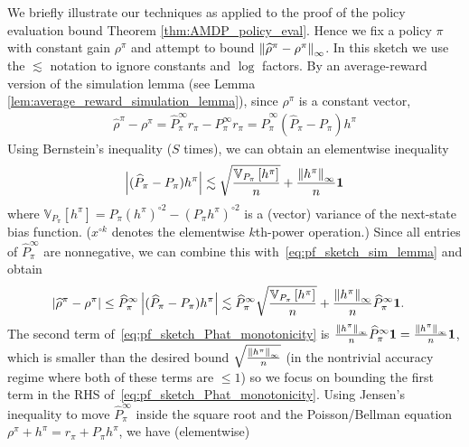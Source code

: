 \documentclass{article}
\theoremstyle{plain}
\theoremstyle{plain}
\theoremstyle{remark}
\theoremstyle{plain}
\theoremstyle{plain}
\newcommand{\Var}{\mathbb{V}}
\newcommand{\Phat}{\widehat{P}}
\newcommand{\one}{\mathbf{1}}
\newcommand{\rhohat}{\widehat{\rho}}
\begin{document}
We briefly illustrate our techniques as applied to the proof of the policy evaluation bound Theorem \ref{thm:AMDP_policy_eval}. Hence we fix a policy $\pi$ with constant gain $\rho^\pi$ and attempt to bound $\infnorm{\rhohat^\pi - \rho^\pi }$. In this sketch we use the $\lesssim$ notation to ignore constants and $\log$ factors.
By an average-reward version of the simulation lemma (see Lemma \ref{lem:average_reward_simulation_lemma}), since $\rho^\pi$ is a constant vector, 
\begin{align}
    \rhohat^\pi - \rho^\pi = \Phat_\pi^\infty r_\pi - P_\pi^\infty r_\pi =  \Phat_\pi^\infty ( \Phat_\pi  - P_\pi) h^\pi \label{eq:pf_sketch_sim_lemma}
\end{align}
Using Bernstein's inequality ($S$ times), we can obtain an elementwise inequality
\begin{align}
    \left|( \Phat_\pi  - P_\pi) h^\pi \right| \lesssim \sqrt{\frac{\Var_{P_\pi}\left[ h^\pi\right]}{n}} + \frac{\infnorm{h^\pi}}{n} \one \label{eq:pf_sketch_bernstein}
\end{align}
where $\Var_{P_\pi}\left[ h^\pi\right] = P_\pi (h^\pi)^{\circ 2} - (P_\pi h^\pi)^{\circ 2}$ is a (vector) variance of the next-state bias function. ($x^{\circ k}$ denotes the elementwise $k$th-power operation.) Since all entries of $\Phat^\infty_\pi$ are nonnegative, we can combine this with~\eqref{eq:pf_sketch_sim_lemma} and obtain
\begin{align}
    \left|\rhohat^\pi - \rho^\pi \right| & \leq \Phat^\infty_\pi \left|( \Phat_\pi  - P_\pi) h^\pi \right| \lesssim \Phat^\infty_\pi \sqrt{\frac{\Var_{P_\pi}\left[ h^\pi\right]}{n}} + \frac{\infnorm{h^\pi}}{n} \Phat^\infty_\pi \one. \label{eq:pf_sketch_Phat_monotonicity}
\end{align}
The second term of~\eqref{eq:pf_sketch_Phat_monotonicity} is $\frac{\infnorm{h^\pi}}{n} \Phat^\infty_\pi \one = \frac{\infnorm{h^\pi}}{n} \one$, which is smaller than the desired bound  $\sqrt{\frac{\left\Vert h^\pi\right\Vert _{\infty}}{n}}$ (in the nontrivial accuracy regime where both of these terms are $\leq 1$) so we focus on bounding the first term in the RHS of~\eqref{eq:pf_sketch_Phat_monotonicity}. Using Jensen's inequality to move $\Phat^\infty_\pi$ inside the square root and the Poisson/Bellman equation $\rho^\pi + h^\pi = r_\pi + P_\pi h^\pi$, we have (elementwise)
\end{document}
